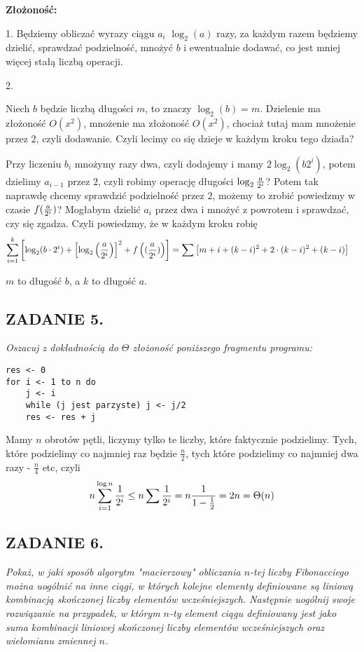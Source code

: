 \documentclass{article}
\begin{document}
\textbf{Złożoność:}

1. Będziemy obliczać wyrazy ciągu $a_i$ $\log_2(a)$ razy, za każdym razem będziemy dzielić, sprawdzać podzielność, mnożyć $b$ i ewentualnie dodawać, co jest mniej więcej stałą liczbą operacji.

2. {\color{yellow} Niech $b$ będzie liczbą długości $m$, to znaczy $\log_2(b)=m$. Dzielenie ma złożoność $O(x^2)$, mnożenie ma złożoność $O(x^2)$, chociaż tutaj mam mnożenie przez $2$, czyli dodawanie. Czyli lecimy co się dzieje w każdym kroku tego dziada?

Przy liczeniu $b_i$ mnożymy razy dwa, czyli dodajemy i mamy $2\log_2(b2^i)$, potem dzielimy $a_{i-1}$ przez $2$, czyli robimy operację długości $\log_2{a\over2^i}$? Potem tak naprawdę chcemy sprawdzić podzielność przez $2$, możemy to zrobić powiedzmy w czasie $f({a\over 2^i})$? Mogłabym dzielić $a_i$ przez dwa i mnożyć z powrotem i sprawdzać, czy się zgadza. Czyli powiedzmy, że w każdym kroku robię
\begin{align*}
    \sum\limits_{i=1}^{k}\left[\log_2(b\cdot {2^i})+\left[\log_2\left({a\over2^{i}}\right)\right]^2+f\left(({a\over2^i})\right)\right]&=\sum\left[m+i+(k-i)^2+2\cdot(k-i)^2+(k-i)\right]
\end{align*}

$m$ to długość $b$, a $k$ to długość $a$.
}

\subsection*{ZADANIE 5.}
\emph{Oszacuj z dokładnością do $\Theta$ złożoność poniższego fragmentu programu:}
\begin{lstlisting}
res <- 0
for i <- 1 to n do
    j <- i
    while (j jest parzyste) j <- j/2
    res <- res + j
\end{lstlisting}

Mamy $n$ obrotów pętli, liczymy tylko te liczby, które faktycznie podzielimy. Tych, które podzielimy co najmniej raz będzie $\frac n2$, tych które podzielimy co najmniej dwa razy - $\frac n4$ etc, czyli
$$n\sum\limits_{i=1}^{\log n}{1\over2^i}\leq n\sum{1\over 2^i}=n{1\over1-\frac12}=2n=\Theta(n)$$

\subsection*{ZADANIE 6.}
\emph{Pokaż, w jaki sposób algorytm "macierzowy" obliczania $n$-tej liczby Fibonacciego można uogólnić na inne ciągi, w których kolejne elementy definiowane są liniową kombinacją skończonej liczby elementów wcześniejszych. Następnie uogólnij swoje rozwiązanie na przypadek, w którym $n$-ty element ciągu definiowany jest jako suma kombinacji liniowej skończonej liczby elementów wcześniejszych oraz wielomianu zmiennej $n$.}
\medskip
\end{document}
